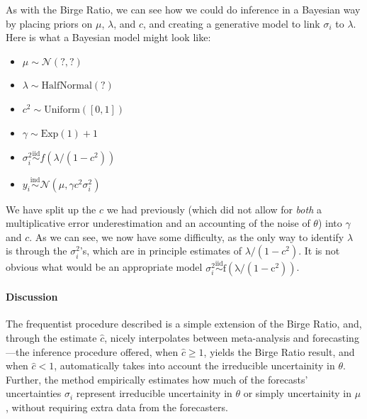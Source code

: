 \documentclass[letterpaper,12pt]{article}
\begin{document}
As with the Birge Ratio, we can see how we could do inference in a Bayesian way by placing priors on $\mu$, $\lambda$, and $c$, and creating a generative model to link $\sigma_i$ to $\lambda$. Here is what a Bayesian model might look like:

\begin{itemize}

\item
  $\mu \sim \mathcal{N}(?,?)$
\item
  $\lambda\sim \mathrm{HalfNormal}(?)$
\item
  $c^2\sim\mathrm{Uniform}([0,1])$
\item
  $\gamma\sim\mathrm{Exp}(1)+1$
\item
  $\sigma_i^2\overset{\mathrm{iid}}{\sim}f(\lambda/(1-c^2))$
\item
  $y_i\overset{\mathrm{ind}}{\sim}\mathcal{N}(\mu,\gamma c^2\sigma_i^2)$
\end{itemize}

We have split up the $c$ we had previously (which did not allow for \emph{both} a multiplicative error underestimation and an accounting of the noise of $\theta$) into $\gamma$ and $c$. As we can see, we now have some difficulty, as the only way to identify $\lambda$ is through the $\sigma_i^2$'s, which are in principle estimates of $\lambda/(1-c^2)$. It is not obvious what would be an appropriate model $\sigma_i^2\overset{\mathrm{iid}}{\sim}\mathrm{f(\lambda/(1-c^2))}$.

\paragraph{Discussion}\label{discussion-1}

The frequentist procedure described is a simple extension of the Birge Ratio, and, through the estimate $\hat c$, nicely interpolates between meta-analysis and forecasting---the inference procedure offered, when $\hat c\geq1$, yields the Birge Ratio result, and when $\hat c<1$, automatically takes into account the irreducible uncertainity in $\theta$. Further, the method empirically estimates how much of the forecasts' uncertainties $\sigma_i$ represent irreducible uncertainity in $\theta$ or simply uncertainity in $\mu$, without requiring extra data from the forecasters.
\end{document}
